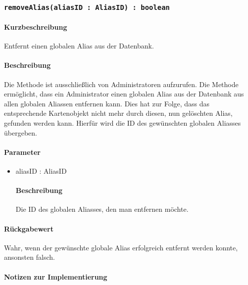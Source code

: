 \subsubsection{\texttt{removeAlias(aliasID : AliasID) : boolean}}%
\paragraph*{Kurzbeschreibung}
Entfernt einen globalen Alias aus der Datenbank.
\paragraph*{Beschreibung}
Die Methode ist ausschließlich von Administratoren aufzurufen.
Die Methode ermöglicht, dass ein Administrator einen globalen Alias aus der Datenbank aus allen globalen Aliassen entfernen kann.
Dies hat zur Folge, dass das entsprechende Kartenobjekt nicht mehr durch diesen, nun gelöschten Alias, gefunden werden kann.
Hierfür wird die ID des gewünschten globalen Aliasses übergeben.
\paragraph*{Parameter}
\begin{itemize}
    \item aliasID : AliasID
    		\paragraph*{Beschreibung}
    		Die ID des globalen Aliasses, den man entfernen möchte.
\end{itemize}
\paragraph*{Rückgabewert}
Wahr, wenn der gewünschte globale Alias erfolgreich entfernt werden konnte, ansonsten falsch.

\paragraph*{Notizen zur Implementierung}%

